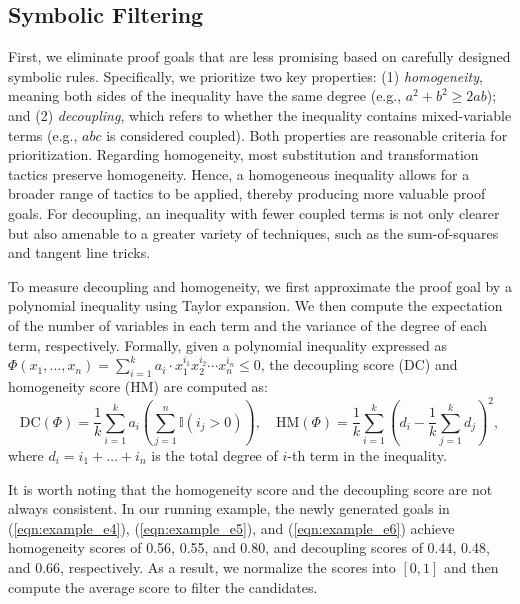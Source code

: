 \vspace{-0.3em}
\subsection{Symbolic Filtering}
\vspace{-0.3em}
First, we eliminate proof goals that are less promising based on carefully designed symbolic rules. Specifically, we prioritize two key properties: (1) \textit{homogeneity}, meaning both sides of the inequality have the same degree (e.g., $a ^2 + b ^ 2 \ge 2 ab$); and (2) \textit{decoupling}, which refers to whether the inequality contains mixed-variable terms (e.g., $abc$ is considered coupled). Both properties are reasonable criteria for prioritization. Regarding homogeneity, most substitution and transformation tactics preserve homogeneity. Hence, a homogeneous inequality allows for a broader range of tactics to be applied, thereby producing more valuable proof goals. For decoupling, an inequality with fewer coupled terms is not only clearer but also amenable to a greater variety of techniques, such as the sum-of-squares and tangent line tricks.

To measure decoupling and homogeneity, we first approximate the proof goal by a polynomial inequality using Taylor expansion. We then compute the expectation of the number of variables in each term and the variance of the degree of each term, respectively. Formally, given a polynomial inequality expressed as $\Phi(x_1, \dots, x_n) = \sum_{i=1}^k a_i \cdot x_1^{i_1} x_2^{i_2} \cdots x_n^{i_n} \leq 0$, the decoupling score (DC) and homogeneity score (HM) are computed as:
\begin{equation*}
\text{DC}(\Phi) = \frac{1}{k} \sum_{i=1} ^ k a_i (\sum_{j=1}^n \mathbb{I}(i_j > 0)), \quad \text{HM}(\Phi) = \frac{1}{k} \sum_{i=1}^k (d_i - \frac{1}{k}\sum_{j=1}^k d_j) ^ 2,
\end{equation*}
where $d_i = i_1 + \dots + i_n$ is the total degree of $i$-th term in the inequality.

It is worth noting that the homogeneity score and the decoupling score are not always consistent. In our running example, the newly generated goals in (\ref{eqn:example_e4}), (\ref{eqn:example_e5}), and (\ref{eqn:example_e6}) achieve homogeneity scores of 0.56, 0.55, and 0.80, and decoupling scores of 0.44, 0.48, and 0.66, respectively. As a result, we normalize the scores into $[0,1]$ and then compute the average score to filter the candidates.



